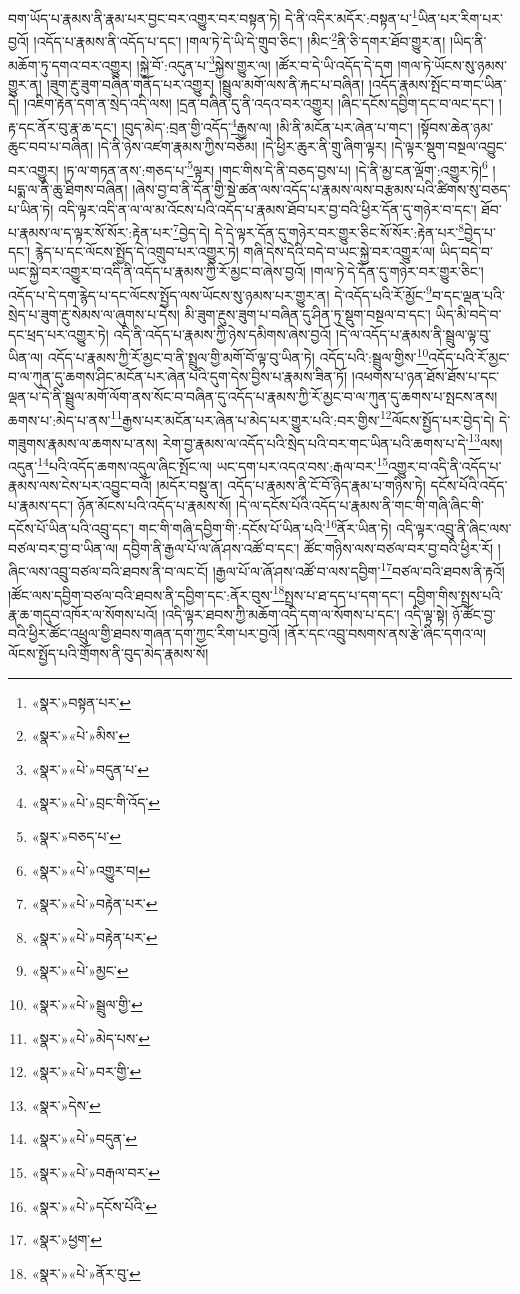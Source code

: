 བག་ཡོད་པ་རྣམས་ནི་རྣམ་པར་བྱང་བར་འགྱུར་བར་བསྟན་ཏེ། དེ་ནི་འདིར་མདོར་:བསྟན་པ་\footnote{«སྣར་»བསྟན་པར་}ཡིན་པར་རིག་པར་བྱའོ། །འདོད་པ་རྣམས་ནི་འདོད་པ་དང་། །གལ་ཏེ་དེ་ཡི་དེ་གྲུབ་ཅིང་། །མིང་\footnote{«སྣར་»«པེ་»མིས་}ནི་ཅི་དགར་ཐོབ་གྱུར་ན། །ཡིད་ནི་མཆོག་ཏུ་དགའ་བར་འགྱུར། །སྐྱེ་བོ་:འདུན་པ་\footnote{«སྣར་»«པེ་»བདུན་པ་}སྐྱེས་གྱུར་ལ། །ཚོར་བ་དེ་ཡི་འདོད་དེ་དག །གལ་ཏེ་ཡོངས་སུ་ཉམས་གྱུར་ན། །ཟུག་རྔུ་ཟུག་བཞིན་གནོད་པར་འགྱུར། །སྦྲུལ་མགོ་ལས་ནི་རྐང་པ་བཞིན། །འདོད་རྣམས་སྤོང་བ་གང་ཡིན་དེ། །འཇིག་རྟེན་དག་ན་སྲེད་འདི་ལས། །དྲན་བཞིན་དུ་ནི་འདའ་བར་འགྱུར། །ཞིང་དངོས་དབྱིག་དང་བ་ལང་དང་། །རྟ་དང་ནོར་བུ་རྣ་ཆ་དང་། །བུད་མེད་:བྲན་གྱི་འདོད་\footnote{«སྣར་»«པེ་»བྲང་གི་འོད་}རྒྱས་ལ། །མི་ནི་མངོན་པར་ཞེན་པ་གང་། །སྟོབས་ཆེན་ཉམ་ཆུང་བབ་པ་བཞིན། །དེ་ནི་ཉེས་འཛག་རྣམས་ཀྱིས་བཅོམ། །དེ་ཕྱིར་ཆུར་ནི་གྲུ་ཞིག་ལྟར། །དེ་ལྟར་སྡུག་བསྔལ་འབྱུང་བར་འགྱུར། །ཏ་ལ་གཏན་ནས་:གཅད་པ་\footnote{«སྣར་»བཅད་པ་}ལྟར། །གང་གིས་དེ་ནི་བཅད་བྱས་པ། །དེ་ནི་མྱ་ངན་ལྡོག་:འགྱུར་ཏེ།\footnote{«སྣར་»«པེ་»འགྱུར་བ།} །པདྨ་ལ་ནི་ཆུ་ཐིགས་བཞིན། །ཞེས་བྱ་བ་ནི་དོན་གྱི་སྡེ་ཚན་ལས་འདོད་པ་རྣམས་ལས་བརྩམས་པའི་ཚིགས་སུ་བཅད་པ་ཡིན་ཏེ། འདི་ལྟར་འདི་ན་ལ་ལ་མ་འོངས་པའི་འདོད་པ་རྣམས་ཐོབ་པར་བྱ་བའི་ཕྱིར་དོན་དུ་གཉེར་བ་དང་། ཐོབ་པ་རྣམས་ལ་ད་ལྟར་སོ་སོར་:རྟེན་པར་\footnote{«སྣར་»«པེ་»བརྟེན་པར་}བྱེད་དེ། དེ་དེ་ལྟར་དོན་དུ་གཉེར་བར་གྱུར་ཅིང་སོ་སོར་:རྟེན་པར་\footnote{«སྣར་»«པེ་»བརྟེན་པར་}བྱེད་པ་དང་། རྙེད་པ་དང་ལོངས་སྤྱོད་དེ་འགྲུབ་པར་འགྱུར་ཏེ། གཞི་དེས་དེའི་བདེ་བ་ཡང་སྐྱེ་བར་འགྱུར་ལ། ཡིད་བདེ་བ་ཡང་སྐྱེ་བར་འགྱུར་བ་འདི་ནི་འདོད་པ་རྣམས་ཀྱི་རོ་མྱང་བ་ཞེས་བྱའོ། །གལ་ཏེ་དེ་དོན་དུ་གཉེར་བར་གྱུར་ཅིང་། འདོད་པ་དེ་དག་རྙེད་པ་དང་ལོངས་སྤྱོད་ལས་ཡོངས་སུ་ཉམས་པར་གྱུར་ན། དེ་འདོད་པའི་རོ་མྱོང་\footnote{«སྣར་»«པེ་»མྱང་}བ་དང་ལྡན་པའི་སྲེད་པ་ཟུག་རྔུ་སེམས་ལ་ཞུགས་པ་དེས། མི་ཟུག་རྔུས་ཟུག་པ་བཞིན་དུ་ཤིན་ཏུ་སྡུག་བསྔལ་བ་དང་། ཡིད་མི་བདེ་བ་དང་ཕྲད་པར་འགྱུར་ཏེ། འདི་ནི་འདོད་པ་རྣམས་ཀྱི་ཉེས་དམིགས་ཞེས་བྱའོ། །དེ་ལ་འདོད་པ་རྣམས་ནི་སྦྲུལ་ལྟ་བུ་ཡིན་ལ། འདོད་པ་རྣམས་ཀྱི་རོ་མྱང་བ་ནི་སྤྲུལ་གྱི་མགོ་བོ་ལྟ་བུ་ཡིན་ཏེ། འདོད་པའི་:སྦྲུལ་གྱིས་\footnote{«སྣར་»«པེ་»སྦྲུལ་གྱི་}འདོད་པའི་རོ་མྱང་བ་ལ་ཀུན་དུ་ཆགས་ཤིང་མངོན་པར་ཞེན་པའི་དུག་དེས་བྱིས་པ་རྣམས་ཟིན་ཏོ། །འཕགས་པ་ཉན་ཐོས་ཐོས་པ་དང་ལྡན་པ་དེ་ནི་སྦྲུལ་མགོ་ལོག་ནས་སོང་བ་བཞིན་དུ་འདོད་པ་རྣམས་ཀྱི་རོ་མྱང་བ་ལ་ཀུན་དུ་ཆགས་པ་སྤངས་ནས། ཆགས་པ་:མེད་པ་ནས་\footnote{«སྣར་»«པེ་»མེད་པས་}རྒྱས་པར་མངོན་པར་ཞེན་པ་མེད་པར་གྱུར་པའི་:བར་གྱིས་\footnote{«སྣར་»«པེ་»བར་གྱི་}ལོངས་སྤྱོད་པར་བྱེད་དེ། དེ་གཟུགས་རྣམས་ལ་ཆགས་པ་ནས། རེག་བྱ་རྣམས་ལ་འདོད་པའི་སྲེད་པའི་བར་གང་ཡིན་པའི་ཆགས་པ་དེ་\footnote{«སྣར་»དེས་}ལས། འདུན་\footnote{«སྣར་»«པེ་»བདུན་}པའི་འདོད་ཆགས་འདུལ་ཞིང་སྤོང་ལ། ཡང་དག་པར་འདའ་བས་:རྒལ་བར་\footnote{«སྣར་»«པེ་»བརྒལ་བར་}འགྱུར་བ་འདི་ནི་འདོད་པ་རྣམས་ལས་ངེས་པར་འབྱུང་བའོ། །མདོར་བསྡུ་ན། འདོད་པ་རྣམས་ནི་ངོ་བོ་ཉིད་རྣམ་པ་གཉིས་ཏེ། དངོས་པོའི་འདོད་པ་རྣམས་དང་། ཉོན་མོངས་པའི་འདོད་པ་རྣམས་སོ། །དེ་ལ་དངོས་པོའི་འདོད་པ་རྣམས་ནི་གང་གི་གཞི་ཞིང་གི་དངོས་པོ་ཡིན་པའི་འབྲུ་དང་། གང་གི་གཞི་དབྱིག་གི་:དངོས་པོ་ཡིན་པའི་\footnote{«སྣར་»«པེ་»དངོས་པོའི་}ནོར་ཡིན་ཏེ། འདི་ལྟར་འབྲུ་ནི་ཞིང་ལས་བཙལ་བར་བྱ་བ་ཡིན་ལ། དབྱིག་ནི་རྒྱལ་པོ་ལ་ཞོ་ཤས་འཚོ་བ་དང་། ཚོང་གཉིས་ལས་བཙལ་བར་བྱ་བའི་ཕྱིར་རོ། །ཞིང་ལས་འབྲུ་བཙལ་བའི་ཐབས་ནི་བ་ལང་ངོ། །རྒྱལ་པོ་ལ་ཞོ་ཤས་འཚོ་བ་ལས་དབྱིག་\footnote{«སྣར་»ཕྱག་}བཙལ་བའི་ཐབས་ནི་རྟའོ། །ཚོང་ལས་དབྱིག་བཙལ་བའི་ཐབས་ནི་དབྱིག་དང་:ནོར་བུས་\footnote{«སྣར་»«པེ་»ནོར་བུ་}སྤྲས་པ་ཐ་དད་པ་དག་དང་། དབྱིག་གིས་སྤྲས་པའི་རྣ་ཆ་གདུབ་འཁོར་ལ་སོགས་པའོ། །འདི་ལྟར་ཐབས་ཀྱི་མཆོག་འདི་དག་ལ་སོགས་པ་དང་། འདི་ལྟ་སྟེ། ཉོ་ཚོང་བྱ་བའི་ཕྱིར་ཚོང་འཕྲུལ་གྱི་ཐབས་གཞན་དག་ཀྱང་རིག་པར་བྱའོ། །ནོར་དང་འབྲུ་བསགས་ནས་རྩེ་ཞིང་དགའ་ལ། ལོངས་སྤྱོད་པའི་གྲོགས་ནི་བུད་མེད་རྣམས་སོ། 